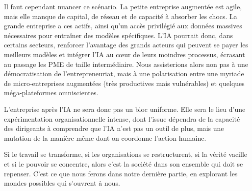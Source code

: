 Il faut cependant nuancer ce scénario. La petite entreprise augmentée est agile, mais elle manque de capital, de réseau et de capacité à absorber les chocs. La grande entreprise a ces actifs, ainsi qu'un accès privilégié aux données massives nécessaires pour entraîner des modèles spécifiques. L'IA pourrait donc, dans certains secteurs, renforcer l'avantage des grands acteurs qui peuvent se payer les meilleurs modèles et intégrer l'IA au cœur de leurs moindres processus, écrasant au passage les PME de taille intermédiaire. Nous assisterions alors non pas à une démocratisation de l'entrepreneuriat, mais à une polarisation entre une myriade de micro-entreprises augmentées (très productives mais vulnérables) et quelques méga-plateformes omniscientes.

L'entreprise après l'IA ne sera donc pas un bloc uniforme. Elle sera le lieu d'une expérimentation organisationnelle intense, dont l'issue dépendra de la capacité des dirigeants à comprendre que l'IA n'est pas un outil de plus, mais une mutation de la manière même dont on coordonne l'action humaine.

Si le travail se transforme, si les organisations se restructurent, si la vérité vacille et si le pouvoir se concentre, alors c'est la société dans son ensemble qui doit se repenser. C'est ce que nous ferons dans notre dernière partie, en explorant les mondes possibles qui s'ouvrent à nous.
